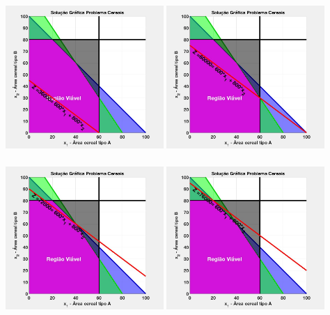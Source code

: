 \documentclass{beamer}
\begin{document}
\begin{frame}
\begin{columns}
\begin{column}{0.5\textwidth}
			\only<18> {\includegraphics[width=6cm,height=6cm]{MatLab/anima_15.png} }
			\only<19> {\includegraphics[width=6cm,height=6cm]{MatLab/anima_16.png} }
			\only<20> {\includegraphics[width=6cm,height=6cm]{MatLab/anima_17.png} }
			\only<21-22> {\includegraphics[width=6cm,height=6cm]{MatLab/anima_18.png} }
		\end{column}
	\end{columns}		
\end{frame}
\end{document}
